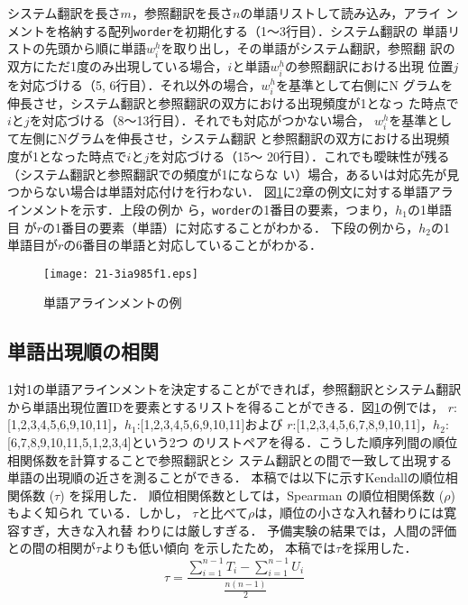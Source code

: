 \documentclass[japanese]{jnlp_1.4}
\begin{document}
システム翻訳を長さ$m$，参照翻訳を長さ$n$の単語リストして読み込み，アライ
ンメントを格納する配列{\tt worder}を初期化する（1〜3行目）．システム翻訳の
単語リストの先頭から順に単語$w_i^h$を取り出し，その単語がシステム翻訳，参照翻
訳の双方にただ1度のみ出現している場合，$i$と単語$w_i^h$の参照翻訳における出現
位置$j$を対応づける（5, 6行目）．それ以外の場合，$w_i^h$を基準として右側にN
グラムを伸長させ，システム翻訳と参照翻訳の双方における出現頻度が1となっ
た時点で$i$と$j$を対応づける（8〜13行目）．それでも対応がつかない場合，
$w_i^h$を基準として左側にNグラムを伸長させ，システム翻訳
と参照翻訳の双方における出現頻度が1となった時点で$i$と$j$を対応づける（15〜
20行目）．これでも曖昧性が残る（システム翻訳と参照翻訳での頻度が1にならな
い）場合，あるいは対応先が見つからない場合は単語対応付けを行わない．
図\ref{figalign}に2章の例文に対する単語アラインメントを示す．上段の例か
ら，\texttt{worder}の1番目の要素，つまり，$h_1$の1単語目
が$r$の1番目の要素（単語）に対応することがわかる．
下段の例から，$h_2$の1単語目が$r$の6番目の単語と対応していることがわかる．

 \begin{figure}[t]
   \begin{center}
\texttt{[image: 21-3ia985f1.eps]}
   \end{center}
    \caption{単語アラインメントの例}
    \label{figalign}
\end{figure}


\subsection{単語出現順の相関}

1対1の単語アラインメントを決定することができれば，参照翻訳とシステム翻訳
から単語出現位置IDを要素とするリストを得ることができる．図\ref{figalign}の例では，
$r$:[1,2,3,4,5,6,9,10,11]，$h_1$:[1,2,3,4,5,6,9,10,11]および
$r$:[1,2,3,4,5,6,7,8,9,10,11]，$h_2$:[6,7,8,9,10,11,5,1,2,3,4]という2つ
のリストペアを得る．こうした順序列間の順位相関係数を計算することで参照翻訳とシ
ステム翻訳との間で一致して出現する単語の出現順の近さを測ることができる．
本稿では以下に示すKendallの順位相関係数 ($\tau$) \cite{kendall}を採用した．
順位相関係数としては，Spearman の順位相関係数 ($\rho$) もよく知られ
ている．しかし，
$\tau$と比べて$\rho$は，順位の小さな入れ替わりには寛容すぎ，大きな入れ替
わりには厳しすぎる．
予備実験の結果では，人間の評価との間の相関が$\tau$よりも低い傾向
を示したため，
\pagebreak
本稿では$\tau$を採用した．
\begin{equation}
 \tau =\frac{\displaystyle \sum_{i=1}^{n-1} T_i - \displaystyle \sum_{i=1}^{n-1}U_i}{\frac{n(n-1)}{2}}
\end{equation}
\end{document}
